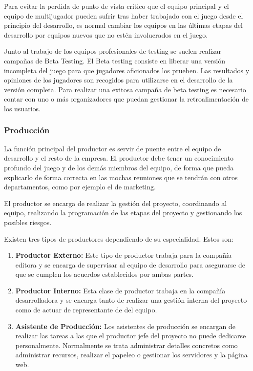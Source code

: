 Para evitar la perdida de punto de vista critico que el equipo principal y el equipo de multijugador pueden sufrir tras haber trabajado con el juego desde el principio del desarrollo, es normal cambiar los equipos en las últimas etapas del desarrollo por equipos nuevos que no estén involucrados en el juego.

Junto al trabajo de los equipos profesionales de testing se suelen realizar campañas de Beta Testing. El Beta testing consiste en liberar una versión incompleta del juego para que jugadores aficionados los prueben. Las resultados y opiniones de los jugadores son recogidos para utilizarse en el desarrollo de la versión completa. Para realizar una exitosa campaña de beta testing es necesario contar con uno o más organizadores que puedan gestionar la retroalimentación de los usuarios.

\subsubsection{Producción}
La función principal del productor es servir de puente entre el equipo de desarrollo y el resto de la empresa. El productor debe tener un conocimiento profundo del juego y de los demás miembros del equipo, de forma que pueda explicarlo de forma correcta en las mochas reuniones que se tendrán con otros departamentos, como por ejemplo el de marketing.

El productor se encarga de realizar la gestión del proyecto, coordinando al equipo, realizando la programación de las etapas del proyecto y gestionando los posibles riesgos.

Existen tres tipos de productores dependiendo de su especialidad. Estos son:
\begin{enumerate}
\item \textbf{Productor Externo:} Este tipo de productor trabaja para la compañía editora y se encarga de supervisar al equipo de desarrollo para asegurarse de que se cumplen los acuerdos establecidos por ambas partes.
\item \textbf{Productor Interno:} Esta clase de productor trabaja en la compañía desarrolladora y se encarga tanto de realizar una gestión interna del proyecto como de actuar de representante de del equipo.
\item \textbf{Asistente de Producción:} Los asistentes de producción se encargan de realizar las tareas a las que el productor jefe del proyecto no puede dedicarse personalmente. Normalmente se trata administrar detalles concretos como administrar recursos, realizar el papeleo o gestionar los servidores y la página web.
\end{enumerate}

